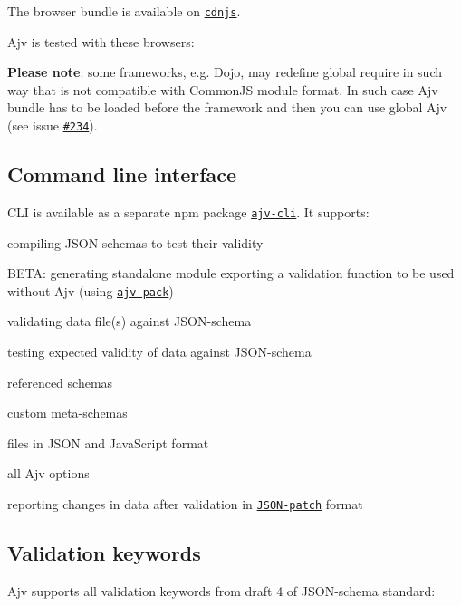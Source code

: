 The browser bundle is available on \href{https://cdnjs.com/libraries/ajv}{\tt cdnjs}.

Ajv is tested with these browsers\+:

\href{https://saucelabs.com/u/epoberezkin}{\tt }

{\bfseries Please note}\+: some frameworks, e.\+g. Dojo, may redefine global require in such way that is not compatible with Common\+JS module format. In such case Ajv bundle has to be loaded before the framework and then you can use global Ajv (see issue \href{https://github.com/epoberezkin/ajv/issues/234}{\tt \#234}).

\subsection*{Command line interface}

C\+LI is available as a separate npm package \href{https://github.com/jessedc/ajv-cli}{\tt ajv-\/cli}. It supports\+:


\begin{DoxyItemize}
\item compiling J\+S\+O\+N-\/schemas to test their validity
\item B\+E\+TA\+: generating standalone module exporting a validation function to be used without Ajv (using \href{https://github.com/epoberezkin/ajv-pack}{\tt ajv-\/pack})
\item validating data file(s) against J\+S\+O\+N-\/schema
\item testing expected validity of data against J\+S\+O\+N-\/schema
\item referenced schemas
\item custom meta-\/schemas
\item files in J\+S\+ON and Java\+Script format
\item all Ajv options
\item reporting changes in data after validation in \href{https://tools.ietf.org/html/rfc6902}{\tt J\+S\+O\+N-\/patch} format
\end{DoxyItemize}

\subsection*{Validation keywords}

Ajv supports all validation keywords from draft 4 of J\+S\+O\+N-\/schema standard\+:



